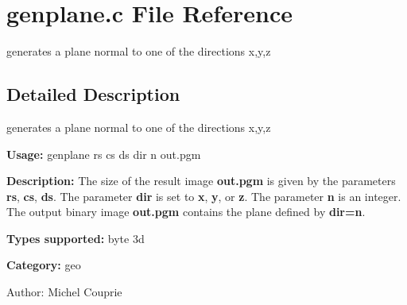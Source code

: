 \section{genplane.c File Reference}
\label{genplane_8c}
generates a plane normal to one of the directions x,y,z  




\label{_details}
\subsection{Detailed Description}
generates a plane normal to one of the directions x,y,z 

{\bf Usage:} genplane rs cs ds dir n out.pgm

{\bf Description:} The size of the result image {\bf out.pgm} is given by the parameters {\bf rs}, {\bf cs}, {\bf ds}. The parameter {\bf dir} is set to {\bf x}, {\bf y}, or {\bf z}. The parameter {\bf n} is an integer. The output binary image {\bf out.pgm} contains the plane defined by {\bf dir=n}.

{\bf Types supported:} byte 3d

{\bf Category:} geo

\begin{Desc}
\item[Author:]Michel Couprie \end{Desc}
